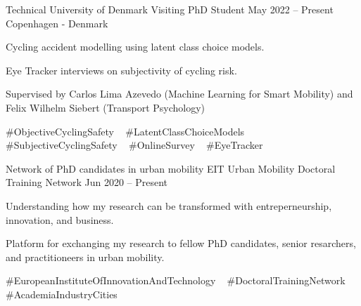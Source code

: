 

\begin{cventries}

  \cventry
    {Technical University of Denmark} %
    {Visiting PhD Student} %
    {May 2022 – Present} %
    {Copenhagen - Denmark} %
    {
      \begin{cvitems} %
        \item {Cycling accident modelling using latent class choice models.}
        \item {Eye Tracker interviews on subjectivity of cycling risk.}
        \item {Supervised by Carlos Lima Azevedo (Machine Learning for Smart Mobility) and Felix Wilhelm Siebert (Transport Psychology)}
      \end{cvitems}
    }
    {
      \#ObjectiveCyclingSafety ~
      \#LatentClassChoiceModels ~
      \#SubjectiveCyclingSafety ~
      \#OnlineSurvey ~
      \#EyeTracker    
    }


  \cventry
    {Network of PhD candidates in urban mobility} %
    {EIT Urban Mobility Doctoral Training Network} %
    {Jun 2020 – Present} %
    {} %
    {
      \begin{cvitems} %
        \item {Understanding how my research can be transformed with entreperneurship, innovation, and business.}
        \item {Platform for exchanging my research to fellow PhD candidates, senior resarchers, and practitioneers in urban mobility.}
      \end{cvitems}
    }
    {
      \#EuropeanInstituteOfInnovationAndTechnology ~
      \#DoctoralTrainingNetwork ~
      \#AcademiaIndustryCities ~
    }



\end{cventries}
